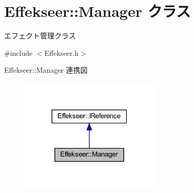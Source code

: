 \hypertarget{class_effekseer_1_1_manager}{}\section{Effekseer\+:\+:Manager クラス}
\label{class_effekseer_1_1_manager}


エフェクト管理クラス  




{\ttfamily \#include $<$Effekseer.\+h$>$}



Effekseer\+:\+:Manager 連携図\nopagebreak
\begin{figure}[H]
\begin{center}
\leavevmode
\includegraphics[width=189pt]{class_effekseer_1_1_manager__coll__graph}
\end{center}
\end{figure}
